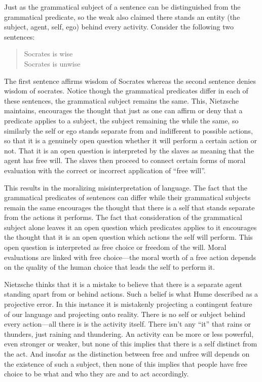 Just as the grammatical subject of a sentence can be distinguished from the grammatical predicate, so the weak also claimed there stands an entity (the subject, agent, self, ego) behind every activity. Consider the following two sentences:
\begin{quote}
	Socrates is wise\\
	Socrates is unwise
\end{quote}
The first sentence affirms wisdom of Socrates whereas the second sentence denies wisdom of socrates. Notice though the grammatical predicates differ in each of these sentences, the grammatical subject remains the same. This, Nietzsche maintains, encourages the thought that just as one can affirm or deny that a predicate applies to a subject, the subject remaining the while the same, so similarly the self or ego stands separate from and indifferent to possible actions, so that it is a genuinely open question whether it will perform a certain action or not. That it is an open question is interpreted by the slaves as meaning that the agent has free will. The slaves then proceed to connect certain forms of moral evaluation with the correct or incorrect application of ``free will''. 

This results in the moralizing misinterpretation of language. The fact that the grammatical predicates of sentences can differ while their grammatical subjects remain the same encourages the thought that there is a self that stands separate from the actions it performs. The fact that consideration of the grammatical subject alone leaves it an open question which predicates applies to it encourages the thought that it is an open question which actions the self will perform. This open question is interpreted as free choice or freedom of the will. Moral evaluations are linked with free choice---the moral worth of a free action depends on the quality of the human choice that leads the self to perform it.

Nietzsche thinks that it is a mistake to believe that there is a separate agent standing apart from or behind actions. Such a belief is what Hume described as a projective error. In this instance it is mistakenly projecting a contingent feature of our language and projecting onto reality. There is no self or subject behind every action---all there is is the activity itself. There isn't any ``it'' that rains or thunders, just raining and thundering. An activity can be more or less powerful, even stronger or weaker, but none of this implies that there is a self distinct from the act. And insofar as the distinction between free and unfree will depends on the existence of such a subject, then none of this implies that people have free choice to be what and who they are and to act accordingly. \change


